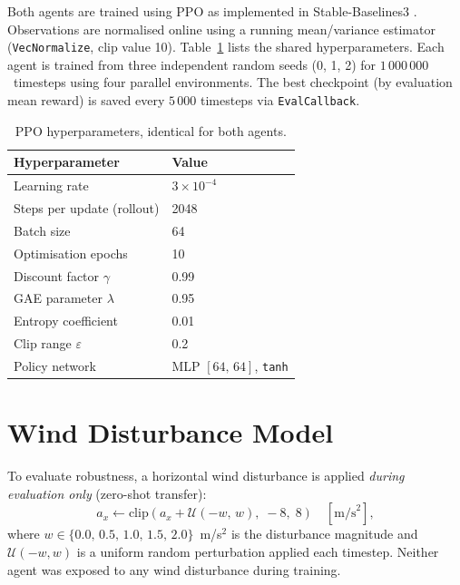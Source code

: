 Both agents are trained using PPO as implemented in Stable-Baselines3
\cite{raffin2021sb3}.
Observations are normalised online using a running mean/variance estimator
(\texttt{VecNormalize}, clip value 10).
Table~\ref{tab:hyperparams} lists the shared hyperparameters.
Each agent is trained from three independent random seeds (0, 1, 2) for
$1\,000\,000$~timesteps using four parallel environments.
The best checkpoint (by evaluation mean reward) is saved every $5\,000$ timesteps via
\texttt{EvalCallback}.

\begin{table}[h]
  \centering
  \caption{PPO hyperparameters, identical for both agents.}
  \label{tab:hyperparams}
  \begin{tabular}{ll}
    \toprule
    Hyperparameter             & Value \\
    \midrule
    Learning rate              & $3 \times 10^{-4}$ \\
    Steps per update (rollout) & 2048 \\
    Batch size                 & 64 \\
    Optimisation epochs        & 10 \\
    Discount factor $\gamma$   & 0.99 \\
    GAE parameter $\lambda$    & 0.95 \\
    Entropy coefficient        & 0.01 \\
    Clip range $\varepsilon$   & 0.2 \\
    Policy network             & MLP $[64,\, 64]$, \texttt{tanh} \\
    \bottomrule
  \end{tabular}
\end{table}

\section{Wind Disturbance Model}
\label{sec:wind_model}

To evaluate robustness, a horizontal wind disturbance is applied \emph{during evaluation
only} (zero-shot transfer):
%
\begin{equation}
  a_x \leftarrow \mathrm{clip}\!\left(a_x + \mathcal{U}(-w,\, w),\; -8,\; 8\right)
  \quad [\text{m/s}^2],
  \label{eq:wind}
\end{equation}
%
where $w \in \{0.0,\, 0.5,\, 1.0,\, 1.5,\, 2.0\}$~m/s$^2$ is the disturbance magnitude
and $\mathcal{U}(-w, w)$ is a uniform random perturbation applied each timestep.
Neither agent was exposed to any wind disturbance during training.
